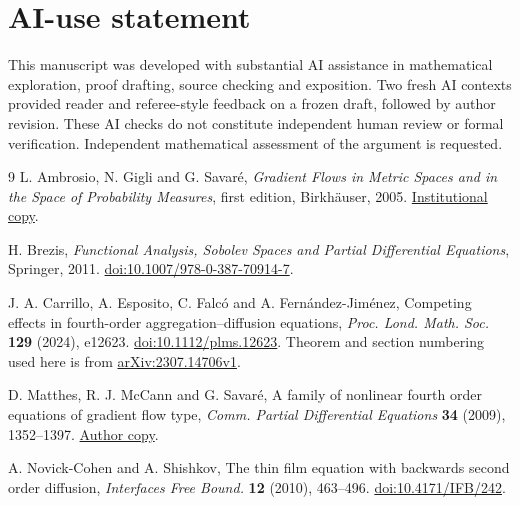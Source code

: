 \documentclass[11pt]{article}
\numberwithin{equation}{section}
\theoremstyle{definition}
\theoremstyle{remark}
\begin{document}
\section*{AI-use statement}
This manuscript was developed with substantial AI assistance in mathematical
exploration, proof drafting, source checking and exposition. Two fresh AI
contexts provided reader and referee-style feedback on a frozen draft,
followed by author revision. These AI checks do not constitute independent
human review or formal verification. Independent mathematical assessment
of the argument is requested.
\begin{thebibliography}{9}
L. Ambrosio, N. Gigli and G. Savar\'e,
\emph{Gradient Flows in Metric Spaces and in the Space of Probability Measures},
first edition, Birkh\"auser, 2005.
\href{https://www2.stat.duke.edu/~sayan/ambrosio.pdf}{Institutional copy}.

H. Brezis, \emph{Functional Analysis, Sobolev Spaces and Partial Differential
Equations}, Springer, 2011.
\href{https://doi.org/10.1007/978-0-387-70914-7}{doi:10.1007/978-0-387-70914-7}.

J. A. Carrillo, A. Esposito, C. Falc\'o and A. Fern\'andez-Jim\'enez,
Competing effects in fourth-order aggregation--diffusion equations,
\emph{Proc. Lond. Math. Soc.} \textbf{129} (2024), e12623.
\href{https://doi.org/10.1112/plms.12623}{doi:10.1112/plms.12623}.
Theorem and section numbering used here is from
\href{https://arxiv.org/abs/2307.14706v1}{arXiv:2307.14706v1}.

D. Matthes, R. J. McCann and G. Savar\'e,
A family of nonlinear fourth order equations of gradient flow type,
\emph{Comm. Partial Differential Equations} \textbf{34} (2009), 1352--1397.
\href{https://www.math.toronto.edu/mccann/papers/MattesMcCannSavare.pdf}{Author copy}.

A. Novick-Cohen and A. Shishkov,
The thin film equation with backwards second order diffusion,
\emph{Interfaces Free Bound.} \textbf{12} (2010), 463--496.
\href{https://doi.org/10.4171/IFB/242}{doi:10.4171/IFB/242}.
\end{thebibliography}
\end{document}
